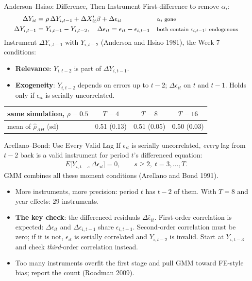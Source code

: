 \documentclass[aspectratio=169,11pt,xcolor=dvipsnames]{beamer}
\newcommand{\srcp}[1]{{\scriptsize\color{gray}(#1)}}
\newcommand{\E}{E}
\begin{document}
\begin{frame}{Anderson--Hsiao: Difference, Then Instrument}
First-difference to remove $\alpha_i$:
\begin{align*}
  \Delta Y_{it} &= \rho\,\Delta Y_{i,t-1} + \Delta X_{it}'\beta + \Delta\epsilon_{it}
   && \text{\footnotesize $\alpha_i$ gone} \\
  \Delta Y_{i,t-1} &= Y_{i,t-1} - Y_{i,t-2}, \quad
  \Delta\epsilon_{it} = \epsilon_{it} - \epsilon_{i,t-1}
   && \text{\footnotesize both contain $\epsilon_{i,t-1}$: endogenous}
\end{align*}
Instrument $\Delta Y_{i,t-1}$ with $Y_{i,t-2}$ \srcp{Anderson and Hsiao 1981}, the
Week 7 conditions:
\begin{itemize}\itemsep3pt
  \item \textbf{Relevance}: $Y_{i,t-2}$ is part of $\Delta Y_{i,t-1}$.
  \item \textbf{Exogeneity}: $Y_{i,t-2}$ depends on errors up to $t-2$;
        $\Delta\epsilon_{it}$ on $t$ and $t-1$. Holds \alert{only if $\epsilon_{it}$
        is serially uncorrelated}.
\end{itemize}
\vskip2pt
\begin{center}\small
\renewcommand{\arraystretch}{1.05}
\begin{tabular}{@{}lccc@{}}
\toprule
same simulation, $\rho = 0.5$ & $T = 4$ & $T = 8$ & $T = 16$ \\
\midrule
mean of $\hat\rho_{AH}$ (sd) & 0.51 (0.13) & 0.51 (0.05) & 0.50 (0.03) \\
\bottomrule
\end{tabular}
\end{center}
\end{frame}

\begin{frame}{Arellano--Bond: Use Every Valid Lag}
If $\epsilon_{it}$ is serially uncorrelated, \emph{every} lag from $t-2$ back is a
valid instrument for period $t$'s differenced equation:
\begin{align*}
  \E\big[Y_{i,t-s}\,\Delta\epsilon_{it}\big] = 0, \qquad s \ge 2,\; t = 3,\dots,T .
\end{align*}
GMM combines all these moment conditions \srcp{Arellano and Bond 1991}.
\vskip3pt
\begin{itemize}\itemsep3pt
  \item More instruments, more precision: period $t$ has $t - 2$ of them. With $T = 8$
        and year effects: 29 instruments.
  \item \textbf{The key check}: the differenced residuals $\Delta\hat\epsilon_{it}$.
        First-order correlation is expected: $\Delta\epsilon_{it}$ and
        $\Delta\epsilon_{i,t-1}$ share $\epsilon_{i,t-1}$. \alert{Second-order correlation must be zero}; if it is not,
        $\epsilon_{it}$ is serially correlated and $Y_{i,t-2}$ is invalid. Start at
        $Y_{i,t-3}$ and check \emph{third}-order correlation instead.
  \item Too many instruments overfit the first stage and pull GMM toward FE-style
        bias; report the count \srcp{Roodman 2009}.
\end{itemize}
\end{frame}
\end{document}

